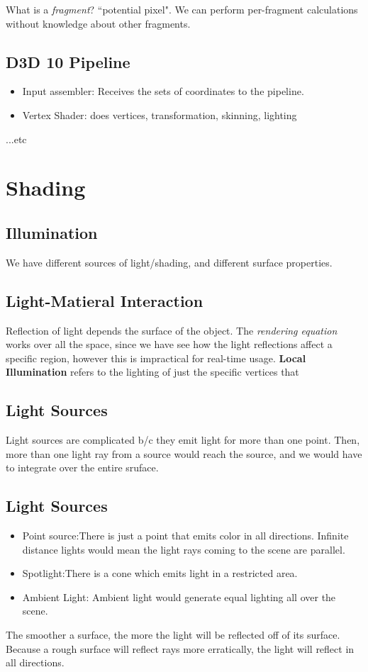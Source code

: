 \documentclass[portrait, 10pt, a4paper]{article}
\begin{document}
\begin{multicols*}{3}
		What is a \textit{fragment}? ``potential pixel". We can perform per-fragment calculations without knowledge 
		about other fragments.

		\subsection{D3D 10 Pipeline}
		\begin{itemize}
			\item{Input assembler}: Receives the sets of coordinates to the pipeline.
			\item{Vertex Shader}: does vertices, transformation, skinning, lighting
		\end{itemize}
		...etc
\section{Shading}
	\subsection{Illumination} We have different sources of light/shading, and different surface properties. 
	\subsection{Light-Matieral Interaction}
		Reflection of light depends the surface of the object. The \textit{rendering equation} works over all the 
		space, since we have  see how the light reflections affect a specific region, however this is impractical
		for real-time usage. \textbf{Local Illumination} refers to the lighting of just the specific vertices that

	\subsection{Light Sources}
		Light sources are complicated b/c they emit light for more than one point. Then, more than one light ray from
		a source would reach the source, and we would have to integrate over the entire sruface.
	\subsection{Light Sources}
		\begin{itemize}
			\item{Point source}:There is just a point that emits color in all directions. Infinite distance lights 
				would mean the light rays coming to the scene are parallel.
			\item{Spotlight}:There is a cone which emits light in a restricted area.
			\item{Ambient Light}: Ambient light would generate equal lighting all over the scene.
		\end{itemize}
		The smoother a surface, the more the light will be reflected off of its surface. Because a rough surface 
		will reflect rays more erratically, the light will reflect in all directions.

\end{multicols*}
\end{document}
